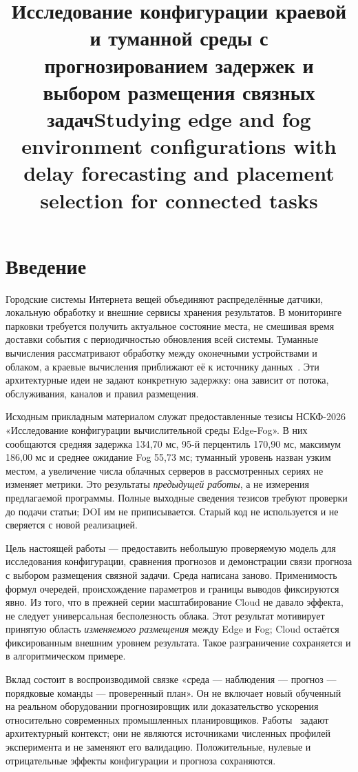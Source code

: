 \documentclass{psta}
\title[Модель среды и прогноз задержек]{Исследование конфигурации краевой и туманной среды с прогнозированием задержек и выбором размещения связных задач}
\title[Environment model and delay forecasting]{Studying edge and fog environment configurations with delay forecasting and placement selection for connected tasks}
\begin{document}
\Russian\maketitle
\hypertarget{english--authorsinfo}{}

\section{Введение}
Городские системы Интернета вещей объединяют распределённые датчики, локальную обработку и внешние сервисы хранения результатов. В мониторинге парковки требуется получить актуальное состояние места, не смешивая время доставки события с периодичностью обновления всей системы. Туманные вычисления рассматривают обработку между оконечными устройствами и облаком, а краевые вычисления приближают её к источнику данных~\cite{bonomi,shi}. Эти архитектурные идеи не задают конкретную задержку: она зависит от потока, обслуживания, каналов и правил размещения.

Исходным прикладным материалом служат предоставленные тезисы НСКФ-2026~\cite{nskf} «Исследование конфигурации вычислительной среды Edge-Fog». В них сообщаются средняя задержка 134,70 мс, 95-й перцентиль 170,90 мс, максимум 186,00 мс и среднее ожидание Fog 55,73 мс; туманный уровень назван узким местом, а увеличение числа облачных серверов в рассмотренных сериях не изменяет метрики. Это результаты \emph{предыдущей работы}, а не измерения предлагаемой программы. Полные выходные сведения тезисов требуют проверки до подачи статьи; DOI им не приписывается. Старый код не используется и не сверяется с новой реализацией.

Цель настоящей работы --- предоставить небольшую проверяемую модель для исследования конфигурации, сравнения прогнозов и демонстрации связи прогноза с выбором размещения связной задачи. Среда написана заново. Применимость формул очередей, происхождение параметров и границы выводов фиксируются явно. Из того, что в прежней серии масштабирование Cloud не давало эффекта, не следует универсальная бесполезность облака. Этот результат мотивирует принятую область \emph{изменяемого размещения} между Edge и Fog; Cloud остаётся фиксированным внешним уровнем результата. Такое разграничение сохраняется и в алгоритмическом примере.

Вклад состоит в воспроизводимой связке «среда --- наблюдения --- прогноз --- порядковые команды --- проверенный план». Он не включает новый обученный на реальном оборудовании прогнозировщик или доказательство ускорения относительно современных промышленных планировщиков. Работы~\cite{bonomi,shi} задают архитектурный контекст; они не являются источниками численных профилей эксперимента и не заменяют его валидацию. Положительные, нулевые и отрицательные эффекты конфигурации и прогноза сохраняются.
\end{document}
